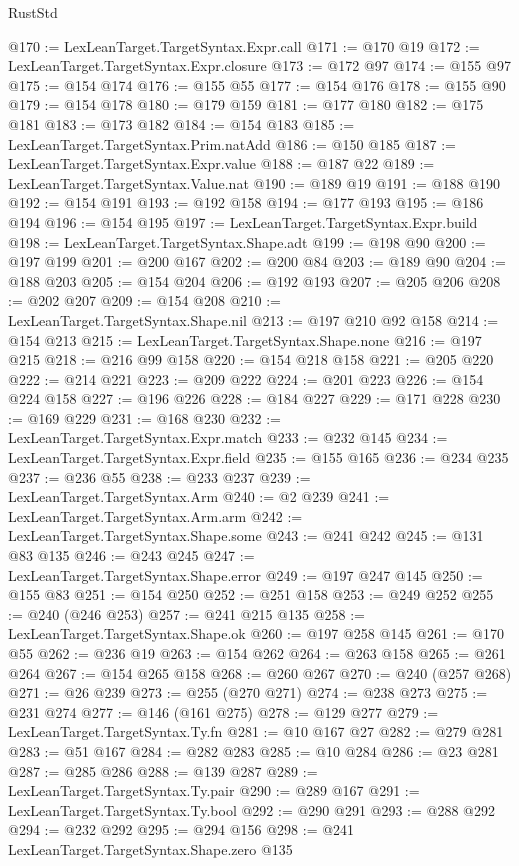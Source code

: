 \begin{lexlean}{RustStd}
\begin{coremodule}
@170 := LexLeanTarget.TargetSyntax.Expr.call
@171 := @170 @19
@172 := LexLeanTarget.TargetSyntax.Expr.closure
@173 := @172 @97
@174 := @155 @97
@175 := @154 @174
@176 := @155 @55
@177 := @154 @176
@178 := @155 @90
@179 := @154 @178
@180 := @179 @159
@181 := @177 @180
@182 := @175 @181
@183 := @173 @182
@184 := @154 @183
@185 := LexLeanTarget.TargetSyntax.Prim.natAdd
@186 := @150 @185
@187 := LexLeanTarget.TargetSyntax.Expr.value
@188 := @187 @22
@189 := LexLeanTarget.TargetSyntax.Value.nat
@190 := @189 @19
@191 := @188 @190
@192 := @154 @191
@193 := @192 @158
@194 := @177 @193
@195 := @186 @194
@196 := @154 @195
@197 := LexLeanTarget.TargetSyntax.Expr.build
@198 := LexLeanTarget.TargetSyntax.Shape.adt
@199 := @198 @90
@200 := @197 @199
@201 := @200 @167
@202 := @200 @84
@203 := @189 @90
@204 := @188 @203
@205 := @154 @204
@206 := @192 @193
@207 := @205 @206
@208 := @202 @207
@209 := @154 @208
@210 := LexLeanTarget.TargetSyntax.Shape.nil
@213 := @197 @210 @92 @158
@214 := @154 @213
@215 := LexLeanTarget.TargetSyntax.Shape.none
@216 := @197 @215
@218 := @216 @99 @158
@220 := @154 @218 @158
@221 := @205 @220
@222 := @214 @221
@223 := @209 @222
@224 := @201 @223
@226 := @154 @224 @158
@227 := @196 @226
@228 := @184 @227
@229 := @171 @228
@230 := @169 @229
@231 := @168 @230
@232 := LexLeanTarget.TargetSyntax.Expr.match
@233 := @232 @145
@234 := LexLeanTarget.TargetSyntax.Expr.field
@235 := @155 @165
@236 := @234 @235
@237 := @236 @55
@238 := @233 @237
@239 := LexLeanTarget.TargetSyntax.Arm
@240 := @2 @239
@241 := LexLeanTarget.TargetSyntax.Arm.arm
@242 := LexLeanTarget.TargetSyntax.Shape.some
@243 := @241 @242
@245 := @131 @83 @135
@246 := @243 @245
@247 := LexLeanTarget.TargetSyntax.Shape.error
@249 := @197 @247 @145
@250 := @155 @83
@251 := @154 @250
@252 := @251 @158
@253 := @249 @252
@255 := @240 (@246 @253)
@257 := @241 @215 @135
@258 := LexLeanTarget.TargetSyntax.Shape.ok
@260 := @197 @258 @145
@261 := @170 @55
@262 := @236 @19
@263 := @154 @262
@264 := @263 @158
@265 := @261 @264
@267 := @154 @265 @158
@268 := @260 @267
@270 := @240 (@257 @268)
@271 := @26 @239
@273 := @255 (@270 @271)
@274 := @238 @273
@275 := @231 @274
@277 := @146 (@161 @275)
@278 := @129 @277
@279 := LexLeanTarget.TargetSyntax.Ty.fn
@281 := @10 @167 @27
@282 := @279 @281
@283 := @51 @167
@284 := @282 @283
@285 := @10 @284
@286 := @23 @281
@287 := @285 @286
@288 := @139 @287
@289 := LexLeanTarget.TargetSyntax.Ty.pair
@290 := @289 @167
@291 := LexLeanTarget.TargetSyntax.Ty.bool
@292 := @290 @291
@293 := @288 @292
@294 := @232 @292
@295 := @294 @156
@298 := @241 LexLeanTarget.TargetSyntax.Shape.zero @135

\end{coremodule}
\end{lexlean}
